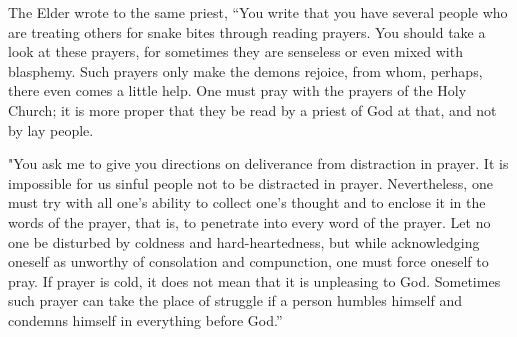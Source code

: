 The Elder wrote to the same priest, “You write that you have several people who are treating others for snake bites through reading prayers. You should take a look at these prayers, for sometimes they are senseless or even mixed with blasphemy. Such prayers only make the demons rejoice, from whom, perhaps, there even comes a little help. One must pray with the prayers of the Holy Church; it is more proper that they be read by a priest of God at that, and not by lay people.

"You ask me to give you directions on deliverance from distraction in prayer. It is impossible for us sinful people not to be distracted in prayer. Nevertheless, one must try with all one's ability to collect one's thought and to enclose it in the words of the prayer, that is, to penetrate into every word of the prayer. Let no one be disturbed by coldness and hard-heartedness, but while acknowledging oneself as unworthy of consolation and compunction, one must force oneself to pray. If prayer is cold, it does not mean that it is unpleasing to God. Sometimes such prayer can take the place of struggle if a person humbles himself and condemns himself in everything before God.”